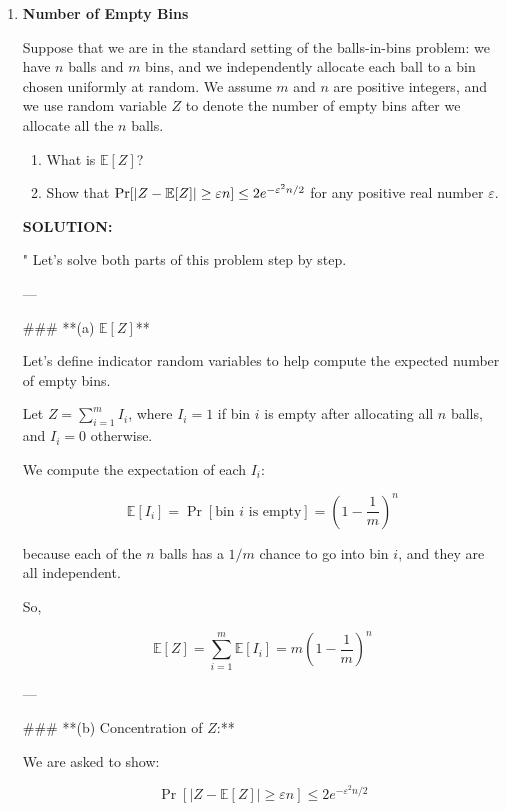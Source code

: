 \begin{enumerate}


\item {} \textbf{Number of Empty Bins} 

Suppose that we are in the standard setting of the balls-in-bins problem: we have $n$ balls and $m$ bins, and we independently allocate each ball to a bin chosen uniformly at random.
We assume $m$ and $n$ are positive integers, and we use random variable $Z$ to denote the number of empty bins after we allocate all the $n$ balls.
\begin{enumerate}
\item {} What is $\mathbb E[Z]$?
\item {} Show that $\Pr[|Z - \mathbb{E}[Z]| \ge \varepsilon n] \leq 2e^{-\varepsilon^2 n/2}$ for any positive real number $\varepsilon$.

\end{enumerate}
\ifdefined\template
\begin{shaded}
\textbf{SOLUTION:}
\ifdefined\sol


"
Let's solve both parts of this problem step by step.

---

### **(a) \(\mathbb{E}[Z]\)**

Let's define indicator random variables to help compute the expected number of empty bins.

Let \( Z = \sum_{i=1}^m I_i \), where \( I_i = 1 \) if bin \( i \) is empty after allocating all \( n \) balls, and \( I_i = 0 \) otherwise.

We compute the expectation of each \( I_i \):

\[
\mathbb{E}[I_i] = \Pr[\text{bin } i \text{ is empty}] = \left(1 - \frac{1}{m}\right)^n
\]

because each of the \( n \) balls has a \( 1/m \) chance to go into bin \( i \), and they are all independent.

So,

\[
\mathbb{E}[Z] = \sum_{i=1}^m \mathbb{E}[I_i] = m\left(1 - \frac{1}{m}\right)^n
\]

---

### **(b) Concentration of \( Z \):**

We are asked to show:

\[
\Pr[|Z - \mathbb{E}[Z]| \geq \varepsilon n] \leq 2e^{-\varepsilon^2 n/2}
\]


\end{shaded}
\end{enumerate}
